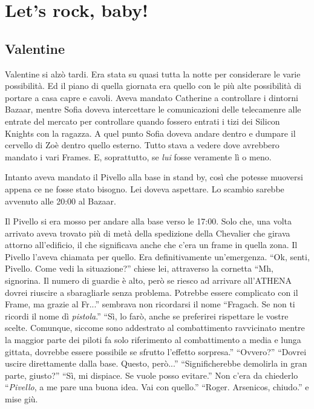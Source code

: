 \chapter{Let's rock, baby!}

  \section*{Valentine}
    
    Valentine si alzò tardi. Era stata su quasi tutta la notte per considerare le varie possibilità. Ed il piano di
    quella giornata era quello con le più alte possibilità di portare a casa capre e cavoli. Aveva mandato Catherine a
    controllare i dintorni Bazaar, mentre Sofia doveva intercettare le comunicazioni delle telecamenre alle entrate del
    mercato per controllare quando fossero entrati i tizi dei Silicon Knights con la ragazza. A quel punto Sofia doveva
    andare dentro e dumpare il cervello di Zoè dentro quello esterno. Tutto stava a vedere dove avrebbero mandato i vari
    Frames. E, soprattutto, se \emph{lui} fosse veramente lì o meno.

    Intanto aveva mandato il Pivello alla base in stand by, così che potesse muoversi appena ce ne fosse stato bisogno.
    Lei doveva aspettare. Lo scambio sarebbe avvenuto alle 20:00 al Bazaar.

    Il Pivello si era mosso per andare alla base verso le 17:00. Solo che, una volta arrivato aveva trovato più di metà
    della spedizione della Chevalier che girava attorno all'edificio, il che significava anche che c'era un frame in
    quella zona. Il Pivello l'aveva chiamata per quello. Era definitivamente un'emergenza. ``Ok, senti, Pivello. Come
    vedi la situazione?'' chiese lei, attraverso la cornetta ``Mh, signorina. Il numero di guardie è alto, però se
    riesco ad arrivare all'ATHENA dovrei riuscire a sbaragliarle senza problema. Potrebbe essere complicato con il
    Frame, ma grazie al Fr...'' sembrava non ricordarsi il nome ``Fragach. Se non ti ricordi il nome dì
    \emph{pistola}.'' ``Sì, lo farò, anche se preferirei rispettare le vostre scelte. Comunque, siccome sono addestrato
    al combattimento ravvicinato mentre la maggior parte dei piloti fa solo riferimento al combattimento a media e lunga
    gittata, dovrebbe essere possibile se sfrutto l'effetto sorpresa.'' ``Ovvero?'' ``Dovrei uscire direttamente dalla
    base. Questo, però...'' ``Significherebbe demolirla in gran parte, giusto?'' ``Sì, mi dispiace. Se vuole posso
    evitare.'' Non c'era da chiederlo ``\emph{Pivello}, a me pare una buona idea. Vai con quello.'' ``Roger. Arsenicos,
    chiudo.'' e mise giù.


